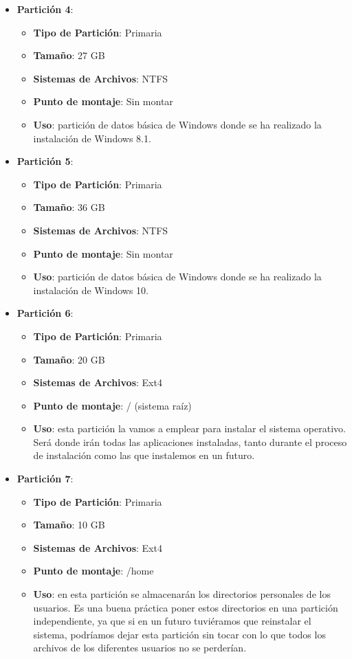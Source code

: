 \begin{itemize}
    \item \textbf{Partición 4}:
    \begin{itemize}
        \item \textbf{Tipo de Partición}: Primaria
        \item \textbf{Tamaño}: 27 GB
        \item \textbf{Sistemas de Archivos}: NTFS
        \item \textbf{Punto de montaje}: Sin montar
        \item \textbf{Uso}: partición de datos básica de Windows donde se ha realizado la instalación de Windows 8.1.
    \end{itemize}

    \item \textbf{Partición 5}:
    \begin{itemize}
        \item \textbf{Tipo de Partición}: Primaria
        \item \textbf{Tamaño}: 36 GB
        \item \textbf{Sistemas de Archivos}: NTFS
        \item \textbf{Punto de montaje}: Sin montar
        \item \textbf{Uso}: partición de datos básica de Windows donde se ha realizado la instalación de Windows 10.
    \end{itemize}

    \item \textbf{Partición 6}:
    \begin{itemize}
        \item \textbf{Tipo de Partición}: Primaria
        \item \textbf{Tamaño}: 20 GB
        \item \textbf{Sistemas de Archivos}: Ext4
        \item \textbf{Punto de montaje}: / (sistema raíz)
        \item \textbf{Uso}: esta partición la vamos a emplear para instalar el sistema operativo. Será donde irán todas las aplicaciones instaladas, tanto durante el proceso de instalación como las que instalemos en un futuro.
    \end{itemize}


    \item \textbf{Partición 7}:
    \begin{itemize}
        \item \textbf{Tipo de Partición}: Primaria
        \item \textbf{Tamaño}: 10 GB
        \item \textbf{Sistemas de Archivos}: Ext4
        \item \textbf{Punto de montaje}: /home
        \item \textbf{Uso}: en esta partición se almacenarán los directorios personales de los usuarios. Es una buena práctica poner estos directorios en una partición independiente, ya que si en un futuro tuviéramos que reinstalar el sistema, podríamos dejar esta partición sin tocar con lo que todos los archivos de los diferentes usuarios no se perderían.
    \end{itemize}


\end{itemize}
